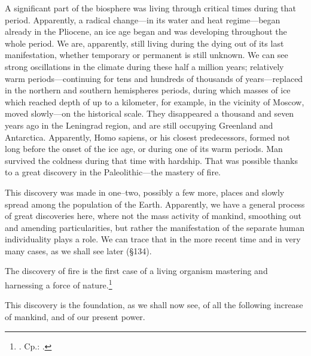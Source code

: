 A significant part of the biosphere was living through critical times during
that period.  Apparently, a radical change---in its water and heat
regime---began already in the Pliocene, an ice age began and was developing
throughout the whole period.  We are, apparently, still living during the
dying out of its last manifestation, whether temporary or permanent is still
unknown.  We can see strong oscillations in the climate during these half a
million years; relatively warm periods---continuing for tens and hundreds of
thousands of years---replaced in the northern and southern hemispheres
periods, during which masses of ice which reached depth of up to a kilometer,
for example, in the vicinity of Moscow, moved slowly---on the historical
scale.  They disappeared a thousand and seven years ago in the Leningrad region, and are still occupying Greenland and
Antarctica.  Apparently, Homo sapiens, or his closest predecessors, formed not
long before the onset of the ice age, or during one of its warm periods.  Man
survived the coldness during that time with hardship.  That was possible thanks
to a great discovery in the Paleolithic---the mastery of fire.

This discovery was made in one--two, possibly a few more, places and slowly
spread among the population of the Earth.  Apparently, we have a general
process of great discoveries here, where not the mass activity of mankind,
smoothing out and amending particularities, but rather the manifestation of
the separate human individuality plays a role.  We can trace that in the more
recent time and in very many cases, as we shall see later (§134).

The discovery of fire is the first case of a living organism mastering and
harnessing a force of nature.\footnote{\cite{childe1937man-p56}. Cp.:
	\cite{frazer1930myths}.}

This discovery is the foundation, as we shall now see, of all the following
increase of mankind, and of our present power.

